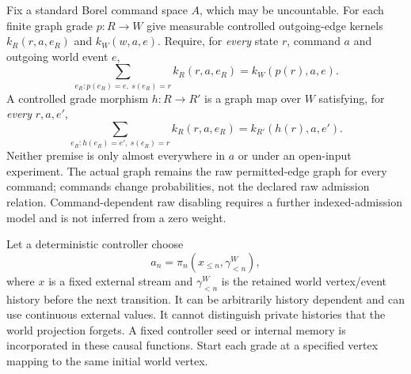 \documentclass[11pt]{article}
\begin{document}
Fix a standard Borel command space $A$, which may be uncountable. For each finite graph grade $p:R\to W$ give measurable controlled outgoing-edge kernels $k_R(r,a,e_R)$ and $k_W(w,a,e)$. Require, for \emph{every} state $r$, command $a$ and outgoing world event $e$,
\[
 \sum_{e_R:p(e_R)=e,\ s(e_R)=r}k_R(r,a,e_R)
       =k_W(p(r),a,e).
\tag{CW}
\]
A controlled grade morphism $h:R\to R'$ is a graph map over $W$ satisfying, for \emph{every} $r,a,e'$,
\[
 \sum_{e_R:h(e_R)=e',\ s(e_R)=r} k_R(r,a,e_R)
       =k_{R'}(h(r),a,e').
\tag{CM}
\]
Neither premise is only almost everywhere in $a$ or under an open-input experiment. The actual graph remains the raw permitted-edge graph for every command; commands change probabilities, not the declared raw admission relation. Command-dependent raw disabling requires a further indexed-admission model and is not inferred from a zero weight.

Let a deterministic controller choose
\[
 a_n=\pi_n(x_{\le n},\gamma^W_{<n}),
\]
where $x$ is a fixed external stream and $\gamma^W_{<n}$ is the retained world vertex/event history before the next transition. It can be arbitrarily history dependent and can use continuous external values. It cannot distinguish private histories that the world projection forgets. A fixed controller seed or internal memory is incorporated in these causal functions. Start each grade at a specified vertex mapping to the same initial world vertex.
\end{document}
